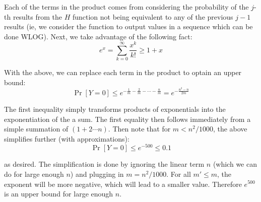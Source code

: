 \documentclass{article}
\begin{document}
\begin{enumerate}
\begin{enumerate}[,label=\alph*.]
Each of the terms in the product comes from considering the probability of the $j$-th results from the $H$
function not being equivalent to any of the previous $j - 1$ results (ie, we consider the function to output values in a sequence
which can be done WLOG). Next, we take advantage of the following fact:%
\noindent\noindent\[%
e^x = \sum_{k=0}^{\infty} \frac{x^k}{k!} \geq 1 + x
\]%

With the above, we can replace each term in the product to optain an upper bound:%
\noindent\noindent\[%
\Pr[Y = 0] \leq e^{-\frac{1}{m} - \frac{2}{m} - \cdots - \frac{n}{m}} = e^{-\frac{n^2-n}{2m}}
\]%

The first inequality simply transforms products of exponentials into the exponentiation of the a sum. 
The first equality then follows immediately from a simple summation of $(1 + 2 \cdots n)$.
Then note that for $m < n^2 /1000$, the above simplifies further (with approximations):%
\noindent\noindent\[%
\Pr[Y = 0] \leq e^{-500} \leq 0.1
\]%

as desired. The simplification is done by ignoring the linear term $n$ (which we can do for large enough $n$) and plugging in $m = n^2/1000$. For all 
$m' \leq m$, the exponent will be more negative, which will lead to a smaller value. Therefore $e^{500}$ is an upper bound
for large enough $n$.
\mdfloatright{\ensuremath{\Box}}%
\end{enumerate}%
\end{enumerate}%
\end{document}
